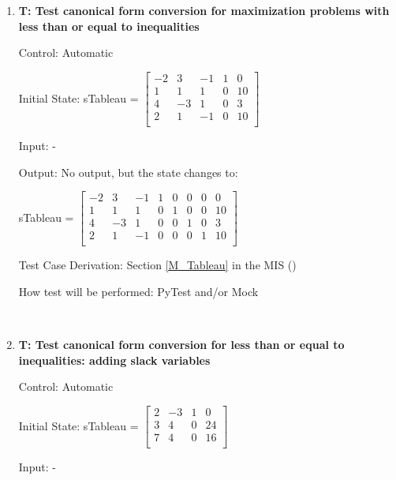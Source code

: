 \documentclass[12pt, titlepage]{article}
\newcounter{testnum} %
\begin{document}
\begin{enumerate}
		
	\item{\textbf{T\thetestnum \label{canonicalMax}: 
	Test canonical form conversion for maximization problems with less than or 
	equal to inequalities}}
		
	Control: Automatic 
		
	Initial State: sTableau = $\begin{bmatrix}
	-2 & 3 & -1 & 1 & 0\\
	1 & 1 & 1 & 0 & 10\\
	4 & -3 & 1 & 0 & 3\\
	2 & 1 & -1 & 0 & 10\\
	\end{bmatrix}$
		
	Input: -
		
	Output: No output, but the state changes to:
	
	sTableau = $\begin{bmatrix}
	-2 & 3 & -1 & 1 & 0 & 0 & 0 & 0\\
	1 & 1 & 1 & 0 & 1 & 0 & 0 & 10\\
	4 & -3 & 1 & 0 & 0 & 1 & 0 & 3\\
	2 & 1 & -1 & 0 & 0 & 0 & 1 & 10\\
	\end{bmatrix}$
	
	Test Case Derivation: Section \ref{M_Tableau} in the MIS (\cite{losms-mis})
		
	How test will be performed: PyTest and/or Mock
	
	 \\

	\item{\textbf{T\thetestnum \label{canonicalSlack}: 
	Test canonical form conversion for less than or equal to inequalities: 
	adding slack variables}}
	
	Control: Automatic 
	
	Initial State: sTableau = $\begin{bmatrix}
	2 & -3 & 1 & 0\\
	3 & 4 & 0 & 24\\
	7 & 4 & 0 & 16\\
	\end{bmatrix}$
	
	Input: -
	

\end{enumerate}
\end{document}
